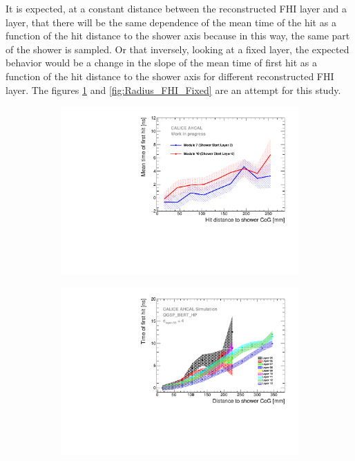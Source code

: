 It is expected, at a constant distance between the reconstructed FHI layer and a layer, that there will be the same dependence of the mean time of the hit as a function of the hit distance to the shower axis because in this way, the same part of the shower is sampled. Or that inversely, looking at a fixed layer, the expected behavior would be a change in the slope of the mean time of first hit as a function of the hit distance to the shower axis for different reconstructed FHI layer. The figures \ref{fig:Radius_FHI} and \ref{fig:Radius_FHI_Fixed} are an attempt for this study.

\begin{figure}[htbp!]
	\begin{subfigure}[t]{0.5\textwidth}
		\centering
		\includegraphics[width=1\textwidth]{../Thesis_Plots/Timing/Pions/Plots/Timing_Radius_Comparison_ShortAsymRange_ShowerStart.pdf}
		\caption{}\label{fig:Radius_FHI}
	\end{subfigure}
	\hfill
	\begin{subfigure}[t]{0.5\textwidth}
		\centering
		\includegraphics[width=1\textwidth]{../Thesis_Plots/Timing/Pions/Plots/Radius_ShowerStartTruth.pdf}

\end{subfigure}
\end{figure}
